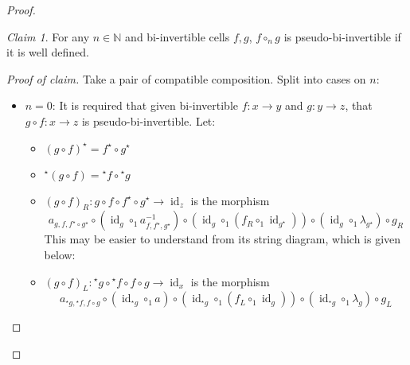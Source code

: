 \documentclass{article}
\theoremstyle{definition}
\theoremstyle{remark}
\newtheorem*{claim}{Claim}
\DeclareMathOperator{\id}{id}
\newcommand{\linv}[1]{{}^\star\!#1}
\newcommand{\rinv}[1]{#1^\star}
\begin{document}
\begin{proof}
  \begin{claim}
    For any \(n \in \mathbb{N}\) and bi-invertible cells \(f,g\), \(f \circ_n g\) is pseudo-bi-invertible if it is well defined.
  \end{claim}
  \begin{proof}[Proof of claim]
    Take a pair of compatible composition. Split into cases on \(n\):
    \begin{itemize}
    \item \(n = 0\): It is required that given bi-invertible \(f : x \to y\) and \(g : y \to z\), that \(g \circ f : x \to z\) is pseudo-bi-invertible. Let:
      \begin{itemize}
      \item \(\rinv {(g \circ f)} = \rinv f \circ \rinv g\)
      \item \(\linv {(g \circ f)} = \linv f \circ \linv g\)
      \item \({(g \circ f)}_R : g \circ f \circ \rinv f \circ \rinv g \to \id_z\) is the morphism
        \begin{equation*}
          a_{g, f, \rinv f \circ \rinv g} \circ (\id_g \circ_1 a_{f,\rinv f, \rinv g}^{-1}) \circ (\id_g \circ_1 (f_R \circ_1 \id_{\rinv g})) \circ (\id_g \circ_1 \lambda_{\rinv g}) \circ g_R
        \end{equation*}
        This may be easier to understand from its string diagram, which is given below:
        \begin{center}
        \end{center}
      \item \({(g \circ f)}_L : \linv g \circ \linv f \circ f \circ g \to \id_x\) is the morphism
        \begin{equation*}
          a_{\linv g, \linv f, f \circ g} \circ (\id_{\linv g} \circ_1 a_{})\circ (\id_{\linv g} \circ_1 (f_L \circ_1 \id_g)) \circ (\id_{\linv g} \circ_1 \lambda_g) \circ g_L

\end{equation*}
\end{itemize}
\end{itemize}
\end{proof}
\end{proof}
\end{document}
